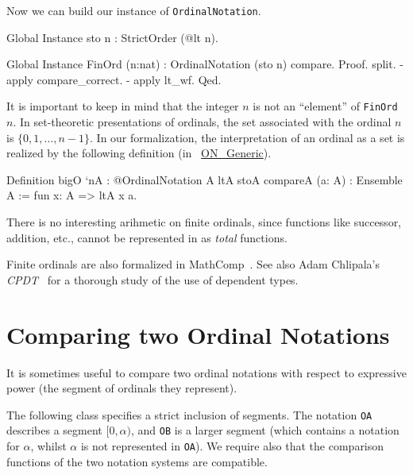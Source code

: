 Now we can build our instance of \texttt{OrdinalNotation}.

\begin{Coqsrc}
Global Instance sto n : StrictOrder (@lt n).

Global Instance FinOrd (n:nat) : OrdinalNotation (sto n) compare.
Proof.
  split.
  - apply compare_correct.
  - apply lt_wf.
Qed.
\end{Coqsrc}

\begin{remark}
It is important to keep in mind  that the integer $n$ is not an ``element'' of \texttt{FinOrd $n$}. In set-theoretic presentations of ordinals, the set associated with the ordinal $n$ is $\{0,1,\dots,n-1\}$. 
In our formalization, the interpretation of an ordinal as a set is realized by the following definition
(in ~\href{../theories/html/hydras.OrdinalNotations.ON_Generic.html}{ON\_Generic}).

\begin{Coqsrc}
Definition bigO `{nA : @OrdinalNotation A ltA stoA compareA}
           (a: A) : Ensemble A :=
  fun x: A => ltA x a.
\end{Coqsrc}
\end{remark}


\begin{remark}
 There is no interesting arihmetic on finite ordinals, since functions like successor, addition, etc.,  cannot be represented in \coq{} as \emph{total} functions.
\end{remark}

\begin{remark}
Finite ordinals are also formalized in MathComp~\cite{SSR}.  See also Adam Chlipala's \emph{CPDT}~\cite{chlipalacpdt2011} for a thorough study of the use of dependent types.  
\end{remark}




\section{Comparing two Ordinal Notations}

It is sometimes useful to compare two ordinal notations with respect to expressive power
(the segment of ordinals  they represent). 

The following class specifies a strict inclusion of segments. The notation \texttt{OA} describes a segment $[0,\alpha)$, and \texttt{OB} is a larger segment (which contains a notation for $\alpha$, whilst $\alpha$ is not represented in \texttt{OA}). We require also  that the comparison functions of the two notation systems are compatible.


